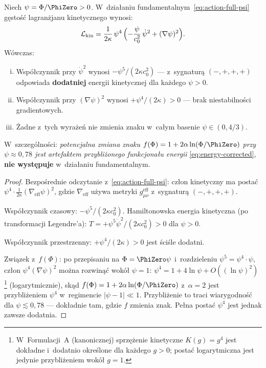 \begin{proposition}%
\label{prop:ghost-free-fundamental}
Niech $\psi = \Phi/\PhiZero > 0$.
W~dzia\l{}aniu fundamentalnym~\eqref{eq:action-full-psi}
g\k{e}sto\'s\'c lagran\.zjanu kinetycznego wynosi:
\begin{equation}\label{eq:L-kin-psi}
  \mathcal{L}_{\mathrm{kin}} = \frac{1}{2\kappa}\,\psi^4\,
  \Bigl(-\frac{\psi}{c_0^2}\,\dot\psi^2 + (\nabla\psi)^2\Bigr).
\end{equation}
W\'owczas:
\begin{enumerate}[(i)]
  \item Wsp\'o\l{}czynnik przy $\dot\psi^2$ wynosi
    $-\psi^5/(2\kappa c_0^2)$ --- z~sygnatur\k{a}
    $(-,+,+,+)$ odpowiada \textbf{dodatniej} energii kinetycznej
    dla ka\.zdego $\psi > 0$.
  \item Wsp\'o\l{}czynnik przy $(\nabla\psi)^2$ wynosi
    $+\psi^4/(2\kappa) > 0$ --- brak niestabilno\'sci gradientowych.
  \item \.Zadne z~tych wyra\.ze\'n nie zmienia znaku
    w~ca\l{}ym basenie $\psi \in (0, 4/3)$.
\end{enumerate}
W~szczeg\'olno\'sci: \emph{potencjalna zmiana znaku
$f(\Phi) = 1 + 2\alpha\ln(\Phi/\PhiZero)$
przy $\psi \approx 0{,}78$ jest artefaktem
przybli\.zonego funkcjona\l{}u energii}
\eqref{eq:energy-corrected},
\textbf{nie wyst\k{e}puje} w~dzia\l{}aniu fundamentalnym.
\end{proposition}

\begin{proof}
Bezpo\'srednie odczytanie z~\eqref{eq:action-full-psi}:
cz\l{}on kinetyczny ma posta\'c
$\psi^4 \cdot \tfrac{1}{2\kappa}(\nabla_{\mathrm{eff}}\psi)^2$,
gdzie $\nabla_{\mathrm{eff}}$ u\.zywa metryki
$g_{\mu\nu}^{\mathrm{eff}}$ z~sygnatur\k{a} $(-,+,+,+)$.

Wsp\'o\l{}czynnik czasowy: $-\psi^5/(2\kappa c_0^2)$.
Hamiltonowska energia kinetyczna (po transformacji Legendre'a):
$T = +\psi^5\dot\psi^2/(2\kappa c_0^2) > 0$
dla $\psi > 0$.

Wsp\'o\l{}czynnik przestrzenny: $+\psi^4/(2\kappa) > 0$
jest \'sci\'sle dodatni.

Zwi\k{a}zek z~$f(\Phi)$: po przepisaniu na $\Phi = \PhiZero\psi$
i~rozdzieleniu $\psi^5 = \psi^4 \cdot \psi$, cz\l{}on
$\psi^4(\nabla\psi)^2$ mo\.zna rozwin\k{a}\'c wok\'o\l{} $\psi=1$:
$\psi^4 = 1 + 4\ln\psi + O((\ln\psi)^2)$%
\footnote{W~Formulacji~A (kanonicznej) sprz\k{e}\.zenie kinetyczne $K(g) = g^4$ jest dok\l{}adne i~dodatnio okre\'slone dla ka\.zdego $g > 0$; posta\'c logarytmiczna jest jedynie przybli\.zeniem wok\'o\l{} $g = 1$.}
(logarytmicznie),
sk\k{a}d $f(\Phi) = 1 + 2\alpha\ln(\Phi/\PhiZero)$
z~$\alpha = 2$
jest przybli\.zeniem $\psi^4$ w~regimencie $|\psi - 1| \ll 1$.
Przybli\.zenie to traci wiarygodno\'s\'c
dla $\psi \lesssim 0{,}78$ --- dok\l{}adnie tam,
gdzie $f$ zmienia znak. Pe\l{}na posta\'c $\psi^4$ jest
jednak zawsze dodatnia.
\end{proof}


